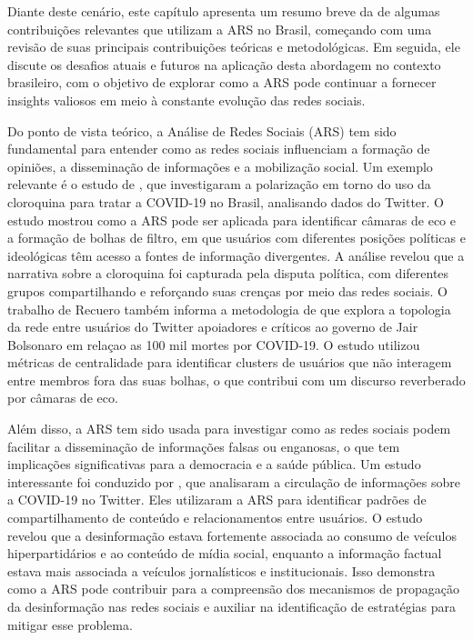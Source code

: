 Diante deste cenário, este capítulo apresenta um resumo breve da de algumas contribuições relevantes que utilizam a ARS no Brasil, começando com uma revisão de suas principais contribuições teóricas e metodológicas. Em seguida, ele discute os desafios atuais e futuros na aplicação desta abordagem no contexto brasileiro, com o objetivo de explorar como a ARS pode continuar a fornecer insights valiosos em meio à constante evolução das redes sociais.

Do ponto de vista teórico, a Análise de Redes Sociais (ARS) tem sido fundamental para entender como as redes sociais influenciam a formação de opiniões, a disseminação de informações e a mobilização social. Um exemplo relevante é o estudo de , que investigaram a polarização em torno do uso da cloroquina para tratar a COVID-19 no Brasil, analisando dados do Twitter. O estudo mostrou como a ARS pode ser aplicada para identificar câmaras de eco e a formação de bolhas de filtro, em que usuários com diferentes posições políticas e ideológicas têm acesso a fontes de informação divergentes. A análise revelou que a narrativa sobre a cloroquina foi capturada pela disputa política, com diferentes grupos compartilhando e reforçando suas crenças por meio das redes sociais. O trabalho de Recuero também informa a metodologia de  que explora a topologia da rede entre usuários do Twitter apoiadores e críticos ao governo de Jair Bolsonaro em relaçao as 100 mil mortes por COVID-19. O estudo utilizou métricas de centralidade para identificar clusters de usuários que não interagem entre membros fora das suas bolhas, o que contribui com um discurso reverberado por câmaras de eco.

Além disso, a ARS tem sido usada para investigar como as redes sociais podem facilitar a disseminação de informações falsas ou enganosas, o que tem implicações significativas para a democracia e a saúde pública. Um estudo interessante foi conduzido por , que analisaram a circulação de informações sobre a COVID-19 no Twitter. Eles utilizaram a ARS para identificar padrões de compartilhamento de conteúdo e relacionamentos entre usuários. O estudo revelou que a desinformação estava fortemente associada ao consumo de veículos hiperpartidários e ao conteúdo de mídia social, enquanto a informação factual estava mais associada a veículos jornalísticos e institucionais. Isso demonstra como a ARS pode contribuir para a compreensão dos mecanismos de propagação da desinformação nas redes sociais e auxiliar na identificação de estratégias para mitigar esse problema.

